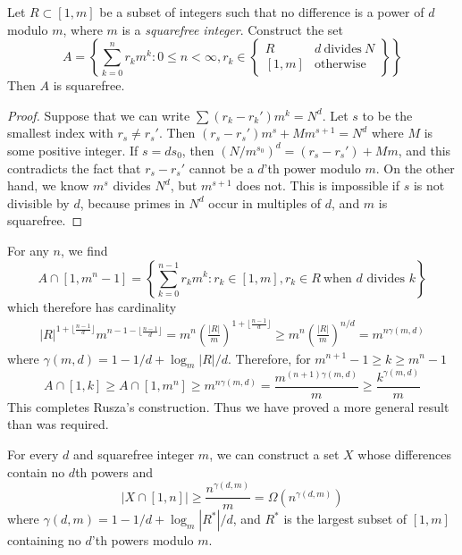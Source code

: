 \begin{theorem}
    Let $R \subset [1,m]$ be a subset of integers such that no difference is a power of $d$ modulo $m$, where $m$ is a {\it squarefree integer}. Construct the set
    \[ A = \left\{ \sum_{k = 0}^n r_k m^k : 0 \leq n < \infty, r_k \in \left. \begin{cases} R & d\ \text{divides}\ N\\ [1,m] & \text{otherwise} \end{cases} \right\} \right\} \]
    Then $A$ is squarefree.
\end{theorem}
\begin{proof}
    Suppose that we can write $\sum (r_k - r_k') m^k = N^d$. Let $s$ to be the smallest index with $r_s \neq r_s'$. Then $(r_s - r_s') m^s + M m^{s+1} = N^d$ where $M$ is some positive integer. If $s = ds_0$, then $(N/m^{s_0})^d = (r_s - r_s') + M m$, and this contradicts the fact that $r_s - r_s'$ cannot be a $d$'th power modulo $m$. On the other hand, we know $m^s$ divides $N^d$, but $m^{s+1}$ does not. This is impossible if $s$ is not divisible by $d$, because primes in $N^d$ occur in multiples of $d$, and $m$ is squarefree.
\end{proof}

For any $n$, we find
%
\[ A \cap [1,m^n - 1] = \left\{ \sum_{k = 0}^{n-1} r_km^k : r_k \in [1,m], r_k \in R\ \text{when $d$ divides $k$} \right\} \]
%
which therefore has cardinality
%
\begin{align*}
    |R|^{1 + \lfloor \frac{n-1}{d} \rfloor} m^{n-1- \lfloor \frac{n-1}{d} \rfloor} = m^n \left( \frac{|R|}{m} \right)^{1 + \lfloor \frac{n-1}{d} \rfloor} \geq m^n \left( \frac{|R|}{m} \right)^{n/d} = m^{n \gamma(m,d)}
\end{align*}
%
where $\gamma(m,d) = 1 - 1/d + \log_m |R|/d$. Therefore, for $m^{n+1} - 1 \geq k \geq m^n - 1$
%
\[ A \cap [1,k] \geq A \cap [1,m^n] \geq m^{n \gamma(m,d)} = \frac{m^{(n+1) \gamma(m,d)}}{m} \geq \frac{k^{\gamma(m,d)}}{m} \]
%
This completes Rusza's construction. Thus we have proved a more general result than was required.

\begin{theorem}
    For every $d$ and squarefree integer $m$, we can construct a set $X$ whose differences contain no $d$th powers and
    \[ |X \cap [1,n]| \geq \frac{n^{\gamma(d,m)}}{m} = \Omega(n^{\gamma(d,m)}) \]
    where $\gamma(d,m) = 1 - 1/d + \log_m |R^*|/d$, and $R^*$ is the largest subset of $[1,m]$ containing no $d$'th powers modulo $m$.
\end{theorem}

